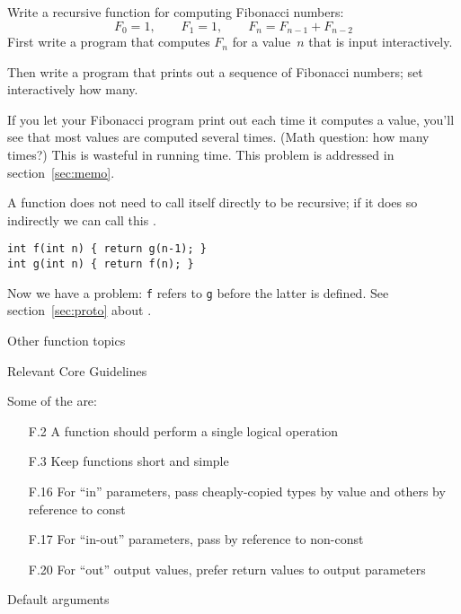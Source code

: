 \begin{exercise}
  \label{ex:recur-fib}
  Write a recursive function for computing Fibonacci numbers:
  \[ F_0=1,\qquad F_1=1,\qquad F_{n}=F_{n-1}+F_{n-2} \]
  First write a program that computes $F_n$ for a value~$n$ that is
  input interactively.

  Then write a program that prints out a sequence of Fibonacci
  numbers; set interactively how many.
\end{exercise}

\begin{remark}
  If you let your Fibonacci program print out each time it computes a
  value, you'll see that most values are computed several times. (Math
  question: how many times?) This is wasteful in running time. This
  problem is addressed in section~\ref{sec:memo}.
\end{remark}

\begin{remark}
  A function does not need to call itself directly to be recursive; if
  it does so indirectly we can call this .
\begin{lstlisting}
int f(int n) { return g(n-1); }
int g(int n) { return f(n); }
\end{lstlisting}
Now we have a problem: \lstinline{f} refers to \lstinline{g}
before the latter is defined.
See section~\ref{sec:proto}
about .
\end{remark}

 {Other function topics}

 {Relevant Core Guidelines}

Some of the  are:

\begin{itemize}
\item[F.2] A function should perform a single logical operation
\item[F.3] Keep functions short and simple
\item[F.16] For “in” parameters, pass cheaply-copied types by value and others by reference to const
\item[F.17] For “in-out” parameters, pass by reference to non-const
\item[F.20] For “out” output values, prefer return values to output parameters
\end{itemize}

 {Default arguments}

